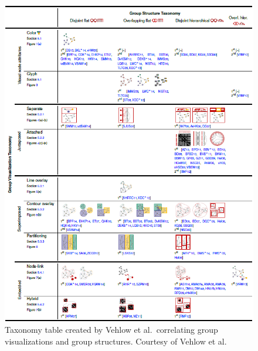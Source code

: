 \begin{figure}[p]
\begin{center}
\includegraphics[width=1\textwidth]{images/vehlow2015state1.png}
\caption{Taxonomy table created by Vehlow et al.\ correlating group visualizations and group structures. Courtesy of Vehlow et al.\ \cite{vehlow2015state}} \label{fig: vehlow2015state1}
\end{center}
\end{figure}


